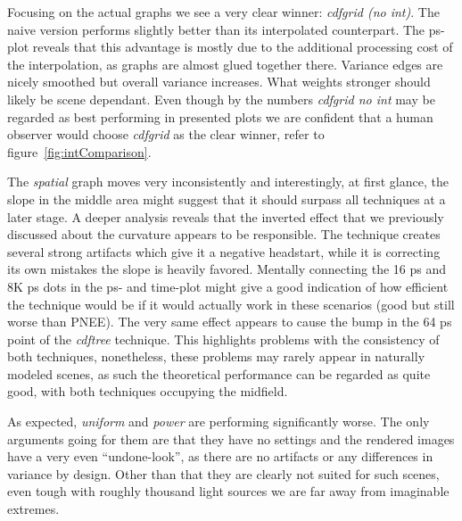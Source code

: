 Focusing on the actual graphs we see a very clear winner: \textit{cdfgrid (no int)}. The naive version performs slightly better than its interpolated counterpart. The ps-plot reveals that this advantage is mostly due to the additional processing cost of the interpolation, as graphs are almost glued together there. Variance edges are nicely smoothed but overall variance increases. What weights stronger should likely be scene dependant. Even though by the numbers \textit{cdfgrid no int} may be regarded as best performing in presented plots we are confident that a human observer would choose \textit{cdfgrid} as the clear winner, refer to figure~\ref{fig:intComparison}.

The \textit{spatial} graph moves very inconsistently and interestingly, at first glance, the slope in the middle area might suggest that it should surpass all techniques at a later stage. A deeper analysis reveals that the inverted effect that we previously discussed about the curvature appears to be responsible. The technique creates several strong artifacts which give it a negative headstart, while it is correcting its own mistakes the slope is heavily favored. Mentally connecting the 16 ps and 8K ps dots in the ps- and time-plot might give a good indication of how efficient the technique would be if it would actually work in these scenarios (good but still worse than PNEE). The very same effect appears to cause the bump in the 64 ps point of the \textit{cdftree} technique. This highlights problems with the consistency of both techniques, nonetheless, these problems may rarely appear in naturally modeled scenes, as such the theoretical performance can be regarded as quite good, with both techniques occupying the midfield. 

As expected, \textit{uniform} and \textit{power} are performing significantly worse. The only arguments going for them are that they have no settings and the rendered images have a very even \enquote{undone-look}, as there are no artifacts or any differences in variance by design. Other than that they are clearly not suited for such scenes, even tough with roughly thousand light sources we are far away from imaginable extremes.

